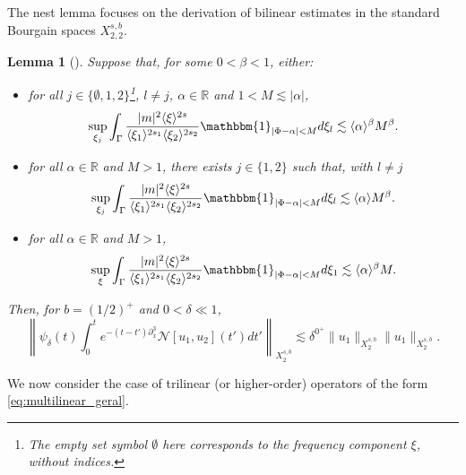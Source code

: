 \documentclass[%
11pt,  reqno]{amsart}
\newcommand{\jap}[1]{\langle #1 \rangle}
\newcommand{\5}{\textup{V}}
\newtheorem{lemma}[theorem]{Lemma}
\theoremstyle{remark}
\newcommand{\R}{\mathbb{R}}
\numberwithin{equation}{section}
\numberwithin{theorem}{section}
\newcommand{\Ncal}{\mathcal{N}}
\begin{document}
{		The nest lemma focuses on the derivation of bilinear estimates in the standard Bourgain spaces $X^{s,b}_{2,2}$.
		
		\begin{lemma}[{\cite[Lemma 3.1]{CLS}}]\label{lem:fre_bi}
			Suppose that, for some $0<\beta<1$, either:
			\begin{itemize}
				\item for all $j\in\{\emptyset,1,2\}$\footnote{The empty set symbol $\emptyset$ here corresponds to the frequency component $\xi$, without indices.}, $l\neq j$, $\alpha\in \R$ and $1<M\lesssim |\alpha|$,
				\begin{equation}\label{eq:frequad}
					\sup_{\xi_j}\int_\Gamma \frac{|m|^2\jap{\xi}^{2s}}{\jap{\xi_{1}}^{2s_1}\jap{\xi_{2}}^{2s_2}}\mathbbm{1}_{|\Phi-\alpha|<M} d\xi_{l} \lesssim \jap{\alpha}^\beta M^\beta.
				\end{equation}
				\item for all $\alpha\in \R$ and $M>1$, there exists $j\in\{1,2\}$ such that, with $l\neq j$
				\begin{equation}\label{eq:frequad2}
					\sup_{\xi_j}\int_\Gamma \frac{|m|^2\jap{\xi}^{2s}}{\jap{\xi_{1}}^{2s_1}\jap{\xi_{2}}^{2s_2}}\mathbbm{1}_{|\Phi-\alpha|<M} d\xi_{l}  \lesssim \jap{\alpha} M^\beta.
				\end{equation}
				\item for all $\alpha\in \R$ and $M>1$,
				\begin{equation}\label{eq:frequad3}
					\sup_{\xi}\int_\Gamma \frac{|m|^2\jap{\xi}^{2s}}{\jap{\xi_{1}}^{2s_1}\jap{\xi_{2}}^{2s_2}}\mathbbm{1}_{|\Phi-\alpha|<M} d\xi_{1}  \lesssim \jap{\alpha}^\beta M.
				\end{equation}
			\end{itemize}
			Then, for $b=(1/2)^+$ and $0<\delta\ll 1$,
			\begin{equation}
				\left\|\psi_\delta(t)\int_0^te^{-(t-t')\partial_x^3} \Ncal[u_1,u_2](t')dt'\right\|_{X^{s,b}_{2}} \lesssim \delta^{0^+}\|u_1\|_{X^{s,b}_{2}} \|u_1\|_{X^{s,b}_{2}}.
			\end{equation}
		\end{lemma}
		
		We now consider the case of trilinear (or higher-order) operators of the form \eqref{eq:multilinear_geral}.
		
}
\end{document}
